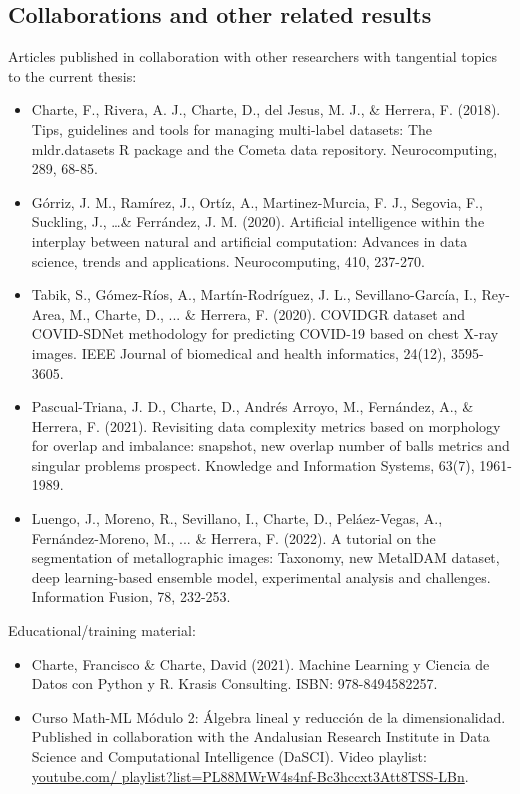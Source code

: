 \subsection{Collaborations and other related results}

Articles published in collaboration with other researchers with tangential topics to the current thesis:

\begin{itemize}
    \item Charte, F., Rivera, A. J., Charte, D., del Jesus, M. J., \& Herrera, F. (2018). Tips, guidelines and tools for managing multi-label datasets: The mldr.datasets R package and the Cometa data repository. Neurocomputing, 289, 68-85.
    \item Górriz, J. M., Ramírez, J., Ortíz, A., Martinez-Murcia, F. J., Segovia, F., Suckling, J., \dots \& Ferrández, J. M. (2020). Artificial intelligence within the interplay between natural and artificial computation: Advances in data science, trends and applications. Neurocomputing, 410, 237-270.
    \item Tabik, S., Gómez-Ríos, A., Martín-Rodríguez, J. L., Sevillano-García, I., Rey-Area, M., Charte, D., ... \& Herrera, F. (2020). COVIDGR dataset and COVID-SDNet methodology for predicting COVID-19 based on chest X-ray images. IEEE Journal of biomedical and health informatics, 24(12), 3595-3605.
    \item Pascual-Triana, J. D., Charte, D., Andrés Arroyo, M., Fernández, A., \& Herrera, F. (2021). Revisiting data complexity metrics based on morphology for overlap and imbalance: snapshot, new overlap number of balls metrics and singular problems prospect. Knowledge and Information Systems, 63(7), 1961-1989.
    \item Luengo, J., Moreno, R., Sevillano, I., Charte, D., Peláez-Vegas, A., Fernández-Moreno, M., ... \& Herrera, F. (2022). A tutorial on the segmentation of metallographic images: Taxonomy, new MetalDAM dataset, deep learning-based ensemble model, experimental analysis and challenges. Information Fusion, 78, 232-253.
\end{itemize}

Educational/training material:

\begin{itemize}
    \item Charte, Francisco \& Charte, David (2021). Machine Learning y Ciencia de Datos con Python y R. Krasis Consulting. ISBN: 978-8494582257.
    \item Curso Math-ML Módulo 2: Álgebra lineal y reducción de la dimensionalidad. Published in collaboration with the Andalusian Research Institute in Data Science and Computational Intelligence (DaSCI). Video playlist: \href{https://www.youtube.com/playlist?list=PL88MWrW4s4nf-Bc3hccxt3Att8TSS-LBn}{youtube.com/ playlist?list=PL88MWrW4s4nf-Bc3hccxt3Att8TSS-LBn}.
\end{itemize}

